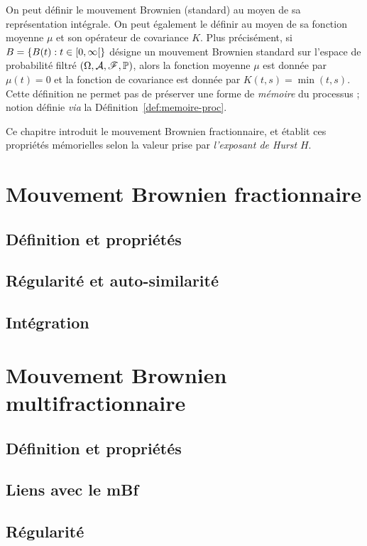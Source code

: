 
On peut définir le mouvement Brownien (standard) au moyen de sa
représentation intégrale. On peut également le définir au moyen de sa
fonction moyenne $\mu$ et son opérateur de covariance $K$. Plus
précisément, si $B = \{B(t) : t \in \left[0,\infty\right[\}$ désigne un
mouvement Brownien standard sur l'espace de probabilité filtré
$\left(\Omega, \mathcal{A}, \mathscr{F}, \mathbb{P}\right)$, alors la fonction moyenne $\mu$
est donnée par $\mu(t) = 0$ et la fonction de covariance est donnée
par $K(t,s) = \min(t,s)$. Cette définition ne permet pas de préserver
une forme de \emph{\og mémoire \fg{}} du processus ; notion définie
\emph{via} la Définition~\ref{def:memoire-proc}.

Ce chapitre introduit le mouvement Brownien fractionnaire, et établit
ces propriétés mémorielles selon la valeur prise par \emph{l'exposant
de Hurst} $H$. 

\section{Mouvement Brownien fractionnaire}
\subsection{Définition et propriétés}
\subsection{Régularité et auto-similarité}
\subsection{Intégration}

\section{Mouvement Brownien multifractionnaire}
\subsection{Définition et propriétés}
\subsection{Liens avec le mBf}
\subsection{Régularité}
